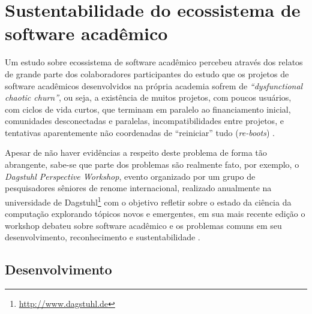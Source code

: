 
\section{Sustentabilidade do ecossistema de software acadêmico}


Um estudo sobre ecossistema de software acadêmico percebeu através dos relatos
de grande parte dos colaboradores participantes do estudo que os projetos de software
acadêmicos desenvolvidos na própria academia sofrem de {\it ``dysfunctional
chaotic churn''}, ou seja, a existência de muitos projetos, com poucos
usuários, com ciclos de vida curtos, que terminam em paralelo ao financiamento
inicial, comunidades desconectadas e paralelas, incompatibilidades entre
projetos, e tentativas aparentemente não coordenadas de ``reiniciar'' tudo
({\it re-boots}) \cite{howison2015understanding}.


Apesar de não haver evidências a respeito deste problema de forma tão abrangente,
sabe-se que parte dos problemas são realmente fato, por exemplo,
o {\it Dagstuhl Perspective Workshop}, evento organizado por um grupo de
pesquisadores sêniores de renome internacional, realizado anualmente na
universidade de Dagstuhl\footnote{\url{http://www.dagstuhl.de}} com o objetivo
refletir sobre o estado da ciência da computação explorando tópicos novos e
emergentes, em sua mais recente edição o workshop debateu sobre software
acadêmico e os problemas comuns em seu desenvolvimento, reconhecimento e
sustentabilidade \cite{allen2017engineering}.

\subsection{Desenvolvimento}

